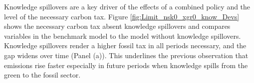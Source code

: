 
Knowledge spillovers are a key driver of the effects of a combined policy and the level of the necessary carbon tax. Figure \ref{fig:Limit_nsk0_xgr0_know_Devs} shows the necessary carbon tax absent knowledge spillovers and compares variables in the benchmark model to the model without knowledge spillovers. 
Knowledge spillovers render a higher fossil tax in all periods necessary, and the gap widens over time (Panel (a)).
This underlines the previous observation that emissions rise faster especially in future periods when knowledge spills from the green to the fossil sector. 

